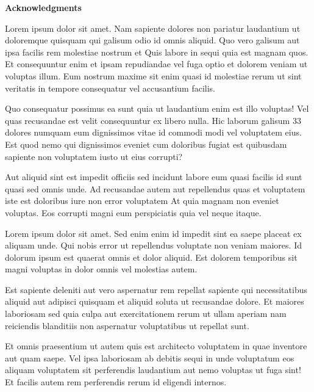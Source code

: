 \thispagestyle{empty}
\begin{center}
    {\Large \bf Acknowledgments}\\ 
    \end{center}




    Lorem ipsum dolor sit amet. Nam sapiente dolores non pariatur laudantium ut doloremque quisquam qui galisum odio id omnis aliquid. Quo vero galisum aut ipsa facilis rem molestiae nostrum et Quis labore in sequi quia est magnam quos. Et consequuntur enim et ipsam repudiandae vel fuga optio et dolorem veniam ut voluptas illum. Eum nostrum maxime sit enim quasi id molestiae rerum ut sint veritatis in tempore consequatur vel accusantium facilis.

    Quo consequatur possimus ea sunt quia ut laudantium enim est illo voluptas! Vel quas recusandae est velit consequuntur ex libero nulla. Hic laborum galisum 33 dolores numquam eum dignissimos vitae id commodi modi vel voluptatem eius. Est quod nemo qui dignissimos eveniet cum doloribus fugiat est quibusdam sapiente non voluptatem iusto ut eius corrupti?
    
    Aut aliquid sint est impedit officiis sed incidunt labore eum quasi facilis id sunt quasi sed omnis unde. Ad recusandae autem aut repellendus quas et voluptatem iste est doloribus iure non error voluptatem At quia magnam non eveniet voluptas. Eos corrupti magni eum perspiciatis quia vel neque itaque.

    

Lorem ipsum dolor sit amet. Sed enim enim id impedit sint ea saepe placeat ex aliquam unde. Qui nobis error ut repellendus voluptate non veniam maiores. Id dolorum ipsum est quaerat omnis et dolor aliquid. Est dolorem temporibus sit magni voluptas in dolor omnis vel molestias autem.

Est sapiente deleniti aut vero aspernatur rem repellat sapiente qui necessitatibus aliquid aut adipisci quisquam et aliquid soluta ut recusandae dolore. Et maiores laboriosam sed quia culpa aut exercitationem rerum ut ullam aperiam nam reiciendis blanditiis non aspernatur voluptatibus ut repellat sunt.

Et omnis praesentium ut autem quis est architecto voluptatem in quae inventore aut quam saepe. Vel ipsa laboriosam ab debitis sequi in unde voluptatum eos aliquam voluptatem sit perferendis laudantium aut nemo voluptas ut fuga sint! Et facilis autem rem perferendis rerum id eligendi internos.


